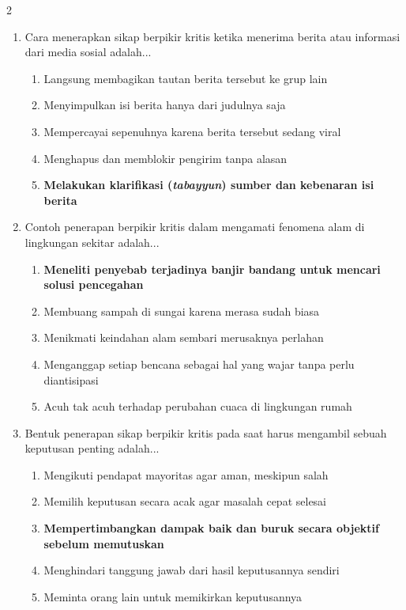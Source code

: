 \documentclass[10pt,a4paper]{article}
\begin{document}
\begin{multicols}{2}
\begin{enumerate}
    \item Cara menerapkan sikap berpikir kritis ketika menerima berita atau informasi dari media sosial adalah...
    \begin{enumerate}
      \item Langsung membagikan tautan berita tersebut ke grup lain
      \item Menyimpulkan isi berita hanya dari judulnya saja
      \item Mempercayai sepenuhnya karena berita tersebut sedang viral
      \item Menghapus dan memblokir pengirim tanpa alasan
      \item \textbf{Melakukan klarifikasi (\textit{tabayyun}) sumber dan kebenaran isi berita}
    \end{enumerate}

    \item Contoh penerapan berpikir kritis dalam mengamati fenomena alam di lingkungan sekitar adalah...
    \begin{enumerate}
      \item \textbf{Meneliti penyebab terjadinya banjir bandang untuk mencari solusi pencegahan}
      \item Membuang sampah di sungai karena merasa sudah biasa
      \item Menikmati keindahan alam sembari merusaknya perlahan
      \item Menganggap setiap bencana sebagai hal yang wajar tanpa perlu diantisipasi
      \item Acuh tak acuh terhadap perubahan cuaca di lingkungan rumah
    \end{enumerate}

    \item Bentuk penerapan sikap berpikir kritis pada saat harus mengambil sebuah keputusan penting adalah...
    \begin{enumerate}
      \item Mengikuti pendapat mayoritas agar aman, meskipun salah
      \item Memilih keputusan secara acak agar masalah cepat selesai
      \item \textbf{Mempertimbangkan dampak baik dan buruk secara objektif sebelum memutuskan}
      \item Menghindari tanggung jawab dari hasil keputusannya sendiri
      \item Meminta orang lain untuk memikirkan keputusannya
    \end{enumerate}


\end{enumerate}
\end{multicols}
\end{document}
